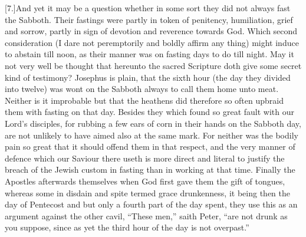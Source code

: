 [7.]And yet it may be a question whether in some sort they did not always fast the Sabboth. Their fastings were partly in token of penitency, humiliation, grief and sorrow, partly in sign of devotion and reverence towards God. Which second consideration (I dare not peremptorily and boldly affirm any thing) might induce to abstain till noon, as their manner was on fasting days to do till night. May it not very well be thought that hereunto the sacred Scripture doth give some secret kind of testimony? Josephus is plain,  that the sixth hour (the day they divided into twelve) was wont on the Sabboth always to call them home unto meat.
 Neither is it improbable but that the heathens did therefore so often upbraid them with fasting on that day. Besides they which found so great fault with our Lord’s disciples, for rubbing a few ears of corn in their hands on the Sabboth day, are not unlikely to have aimed also at the same mark. For neither was the bodily pain so great that it should offend them in that respect, and the very manner of defence which our Saviour there useth is more direct and literal to justify the breach of the Jewish custom in fasting than in working at that time. Finally the Apostles afterwards themselves when God first gave them the gift of tongues, whereas some in disdain and spite termed grace drunkenness, it being then the day of Pentecost and but only a fourth part of the day spent, they use this as an argument against the other cavil, “These men,” saith Peter, “are not drunk as you suppose, since as yet the third hour of the day is not overpast.”

